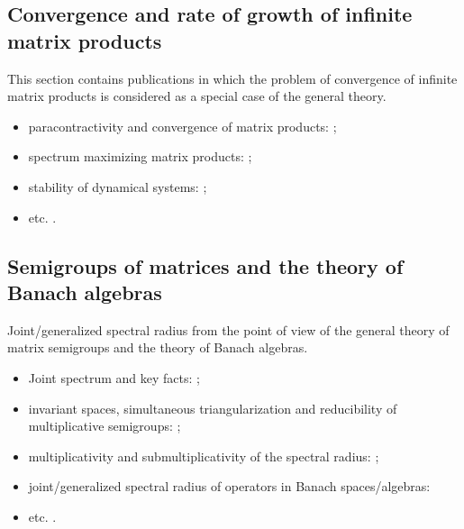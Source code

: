 \documentclass[a4paper,fleqn]{article}
\let\cite=\citep
\begin{document}
\subsection*{Convergence and rate of growth of infinite matrix products}
This section contains publications in which the problem of convergence of infinite matrix products is considered as a special case of the general theory.

\begin{itemize}
\item paracontractivity and convergence of matrix products: \cite{BeynEls96, BE:EJLA97, NeuSch:ArXiv98, VEB:LAA00, Mojskerc:LAA14, WangCheng:LMA16};
\item spectrum maximizing matrix products:  \cite{BochiLas:SAIMJMAA24, CGSZ:LAA10, JSRpack, GugProt:SIAMJMAA16, GugZen:LAA08};
\item stability of dynamical systems: \cite{Ahmadi08, AhmPar:CDC05, Bar:CDC05, BrayTong:TCS79, BrayTong:TCS80, GugZen:LNM14, Koz:AiT90:10:e, AKKK:92:e, ShihWP:LAA97, SBKK:CDC97, Shih:LAA99, KasBh:2000, BTV:MTNS02};
\item etc. \cite{AndoShih:SIAM:98, BerWang:LAA92, BEN:ETNA94, CiconePhD11, Cohen:MPCPS79, DaubLag:LAA92, DaubLag:LAA01, EF:LAA97, FLS:ETDS19, GugZen:LAA01, GurRod:SIAMJMAA97, GugZen:LAA03, Hajnal:MPCPS76, Hartfiel02, Holtz:EJLA00, HR:APM12, Koz:DDNS18, Koz:ArXiv20, Mate:PAMS98, Mate:FM99, NSch:LAA99, PJ:LAA13, Shen:LAA00, ShihPang:AJIFAC08, SU:SIAMJMAA94, Thomas:Arxiv18, Thomas:ArXiv22, Vlad:ArXiv16}.
\end{itemize}

\subsection*{Semigroups of matrices and the theory of Banach algebras}
Joint/generalized spectral radius from the point of view of the general theory of matrix semigroups and the theory of Banach algebras.

\begin{itemize}

\item Joint spectrum and key facts: \cite{Bell:LAA05, BerWang:LAA92,
BreSert:LMS21, EE:PAMS04, GurRod:SIAMJMAA97, Lur:LAA06-2, RS:PAMS95,
Sert:Thesis16, Sert:CRMASP17};
\item invariant spaces, simultaneous triangularization and reducibility of multiplicative semigroups: \cite{Drnov:97, Drnovsek:SM97, Drn:IEOT01, GPRSTT:P10, Guinand:PAMS82, HNRRR:HJM91, LMMR:JOT98, OmRadj:LAA97, Prot:FPM96:e, Radj:IUMJ90, RRS:PAMS00, Szep:AMH86};
\item multiplicativity and submultiplicativity of the spectral radius: \cite{LR:CJM95, OmRadj:LAA97, ProtVoy:LAA17};
\item joint/generalized spectral radius of operators in Banach spaces/algebras: \cite{BD:StochDyn21, BF:AIF21, Bogdanovic:ArXiv23, BP:LMA23, EE:PAMS04, LS:LAA02, KisShulTur:20, Morris:JFA12, Muller:APM97, Pep:LMA11, Peperko:LAA12, RS:PAMS95, ShulTur:ArXiv12, ShulTur:JFA00, ShulTur:SM02, Turovskii:JFA99, TurShul:FAP00, TurShul:FAP12}
\item etc. \cite{Javaheri:JMAA13, ManSim:TCS78}.
\end{itemize}
\end{document}
